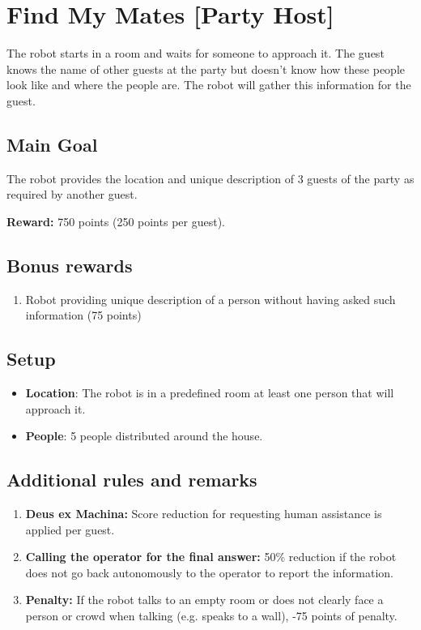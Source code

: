 \section{Find My Mates [Party Host]}

The robot starts in a room and waits for someone to approach it. The guest knows the name of other guests at the party but doesn’t know how these people look like and where the people are. The robot will gather this information for the guest.


\subsection{Main Goal}
The robot provides the location and unique description of 3 guests of the party as required by another guest.

\noindent\textbf{Reward:} 750 points (250 points per guest).

\subsection{Bonus rewards}
\begin{enumerate}[nosep]
	\item Robot providing unique description of a person without having asked such information (75 points)
\end{enumerate}


\subsection{Setup}
\begin{itemize}
	\item \textbf{Location}: The robot is in a predefined room at least one person that will approach it.

	\item \textbf{People}: 5 people distributed around the house.
\end{itemize}

\subsection{Additional rules and remarks}
\begin{enumerate}[nosep]
	\item \textbf{Deus ex Machina:} Score reduction for requesting human assistance is applied per guest.

	\item \textbf{Calling the operator for the final answer:} 50\% reduction if the robot does not go back autonomously to the operator to report the information.
	
	\item \textbf{Penalty:} If the robot talks to an empty room or does not clearly face a person or crowd when talking (e.g. speaks to a wall), -75 points of penalty.
\end{enumerate}



